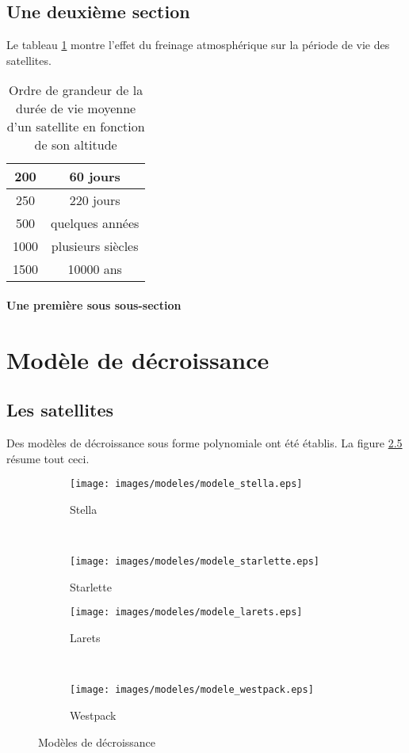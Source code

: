 \documentclass[a4paper,11pt]{report}
\begin{document}
\section{Une deuxième section}
Le tableau \ref{tab:Ordre} montre l'effet du freinage atmosphérique sur la période de vie des satellites.
\begin{table}[!h]
\centering
\begin{tabular}{|c|c|}
\hline
200 & 60 jours \\
\hline
250 & 220 jours \\
\hline
500 & quelques années \\
\hline
1000 & plusieurs siècles \\
\hline
1500 & 10000 ans\\
\hline
\end{tabular}
\caption{Ordre de grandeur de la durée de vie moyenne d'un satellite en fonction de son altitude}
\label{tab:Ordre}
\end{table}
\subsubsection{Une première sous sous-section}

\chapter{Modèle de décroissance}
\minitoc
\section{Les satellites}

Des modèles de décroissance sous forme polynomiale ont été établis. La figure \ref{img:décroissance} résume tout ceci.

\begin{figure}[h]
\centering
\begin{subfigure}{0.45\textwidth}
\centering
\texttt{[image: images/modeles/modele\_stella.eps]}
\caption{Stella}
\label{img:Stella}
\end{subfigure}
~
\begin{subfigure}{0.45\textwidth}
\centering
\texttt{[image: images/modeles/modele\_starlette.eps]}
\caption{Starlette}
\label{img:Starlette}
\end{subfigure}

\begin{subfigure}{0.45\textwidth}
\centering
\texttt{[image: images/modeles/modele\_larets.eps]}
\caption{Larets}
\label{img:Larets}
\end{subfigure}
~
\begin{subfigure}{0.45\textwidth}
\centering
\texttt{[image: images/modeles/modele\_westpack.eps]}
\caption{Westpack}
\label{img:Westpack}
\end{subfigure}
\caption{Modèles de décroissance}
\label{img:décroissance}
\end{figure}
\end{document}
